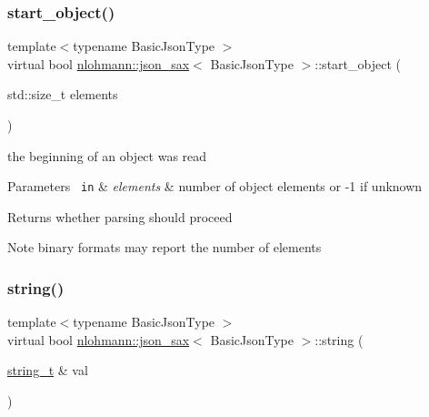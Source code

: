 \subsubsection{\texorpdfstring{start\_object()}{start\_object()}}
{\footnotesize\ttfamily template$<$typename Basic\+Json\+Type $>$ \\
virtual bool \mbox{\hyperlink{structnlohmann_1_1json__sax}{nlohmann\+::json\+\_\+sax}}$<$ Basic\+Json\+Type $>$\+::start\+\_\+object (\begin{DoxyParamCaption}\item[{std\+::size\+\_\+t}]{elements }\end{DoxyParamCaption})\hspace{0.3cm}{\ttfamily [pure virtual]}}



the beginning of an object was read 


\begin{DoxyParams}[1]{Parameters}
\mbox{\texttt{ in}}  & {\em elements} & number of object elements or -\/1 if unknown \\
\hline
\end{DoxyParams}
\begin{DoxyReturn}{Returns}
whether parsing should proceed 
\end{DoxyReturn}
\begin{DoxyNote}{Note}
binary formats may report the number of elements 
\end{DoxyNote}
\mbox{\label{structnlohmann_1_1json__sax_a07eab82f6c82d606787eee9ad73d2bda}} 
\subsubsection{\texorpdfstring{string()}{string()}}
{\footnotesize\ttfamily template$<$typename Basic\+Json\+Type $>$ \\
virtual bool \mbox{\hyperlink{structnlohmann_1_1json__sax}{nlohmann\+::json\+\_\+sax}}$<$ Basic\+Json\+Type $>$\+::string (\begin{DoxyParamCaption}\item[{\mbox{\hyperlink{structnlohmann_1_1json__sax_ae01977a9f3c5b3667b7a2929ed91061e}{string\+\_\+t}} \&}]{val }\end{DoxyParamCaption})\hspace{0.3cm}{\ttfamily [pure virtual]}}



